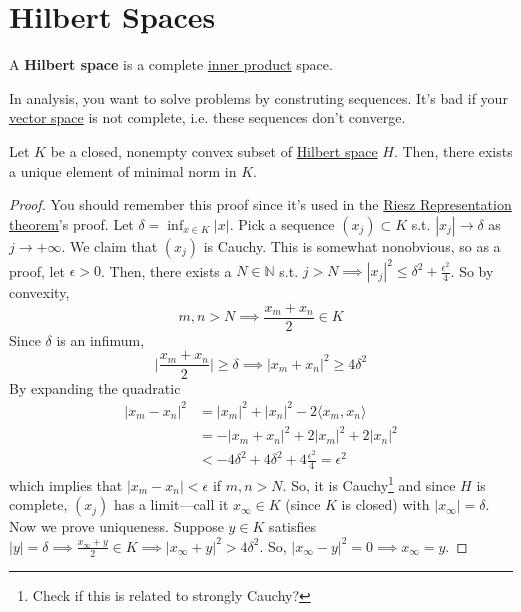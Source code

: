 \section{Hilbert Spaces} 

	\begin{definition}
	  \label{def:hilbert-space}
		A \textbf{Hilbert space} is a complete \hyperref[lin-def:inner-product]{inner product} space. 
	\end{definition}

	In analysis, you want to solve problems by construting sequences. It's bad if your \hyperref[lin-def:vector-space]{vector space} is not complete, i.e. these sequences don't converge. 

	\begin{lemma}
	  \label{thm:nearest-point-in-a-closed-convex-subset-of-a}
	  Let $K$ be a closed, nonempty convex subset of \hyperref[def:hilbert-space]{Hilbert space} $H$. Then, there exists a unique element of minimal norm in $K$. 
	\end{lemma}
	\begin{proof}
		You should remember this proof since it's used in the \hyperref[thm:riesz-representation-theorem]{Riesz Representation theorem}'s proof. Let $\delta = \inf_{x \in K} |x|$. Pick a sequence $(x_j) \subset K$ s.t. $|x_j| \to \delta$ as $j \to +\infty$. We claim that $(x_j)$ is Cauchy. This is somewhat nonobvious, so as a proof, let $\epsilon > 0$. Then, there exists a $N \in \mathbb{N}$ s.t. $j > N \implies |x_j|^2 \leq \delta^2 + \frac{\epsilon^2}{4}$. So by convexity, 
		\begin{equation}
			m, n > N \implies \frac{x_m + x_n}{2} \in K
		\end{equation}
		Since $\delta$ is an infimum, 
		\begin{equation}
			\bigg| \frac{x_m + x_n}{2} \bigg| \geq \delta \implies |x_m + x_n|^2 \geq 4 \delta^2
		\end{equation}
		By expanding the quadratic 
		\begin{align}
			|x_m - x_n|^2 & = |x_m|^2 + |x_n|^2 - 2 \langle x_m, x_n \rangle \\ 
										& = - |x_m + x_n|^2 + 2|x_m|^2 + 2|x_n|^2 \\ 
										& < - 4 \delta^2 + 4 \delta^2 + 4 \frac{\epsilon^2}{4} = \epsilon^2
		\end{align} 
		which implies that $|x_m - x_n| < \epsilon$ if $m, n > N$. So, it is Cauchy\footnote{Check if this is related to strongly Cauchy?} and since $H$ is complete, $(x_j)$ has a limit---call it $x_\infty \in K$ (since $K$ is closed) with $|x_\infty| = \delta$. Now we prove uniqueness. Suppose $y \in K$ satisfies $|y| = \delta \implies \frac{x_\infty + y}{2} \in K \implies |x_\infty + y|^2 > 4 \delta^2$. So, $|x_\infty - y|^2 = 0 \implies x_\infty = y$. 
	\end{proof}
    
